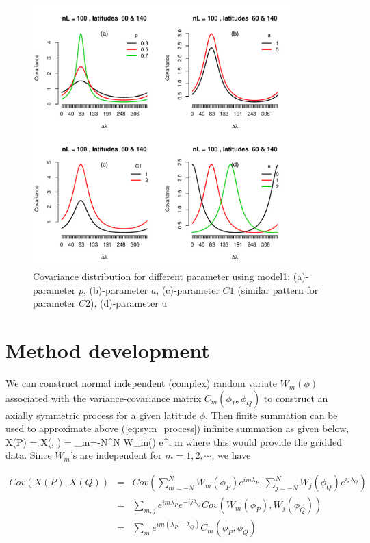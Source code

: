 	\begin{figure}[H]
		\centering
		\includegraphics[width=0.9\textwidth]{graphs/parameters_model1_2}
		\caption[Covariance distribution for different parameters using model1:] {Covariance distribution for different parameter using model1:  (a)-parameter $p$, (b)-parameter $a$, (c)-parameter $C1$ (similar pattern for parameter $C2$), (d)-parameter u}
	\end{figure}
	
	
	
	\section{Method development}
		
		
	We can construct normal independent (complex) random variate $W_m(\phi)$ associated with the variance-covariance matrix $C_m(\phi_P, \phi_Q)$ to construct an axially symmetric process for a given latitude $\phi$. Then finite summation can be used to approximate above (\ref{eq:sym_process}) infinite summation as given below,
	\beq
	X(P) = X(\phi, \lambda) = \sum_{m=-N}^{N} W_m(\phi) e^{i m \lambda}
	\eeq
	where this would provide  the gridded data.
	Since $W_m$'s are independent for $m = 1, 2, \cdots$, we have
		
	\begin{eqnarray*}
		Cov(X(P), {X(Q)}) &=& Cov\left(\sum_{m = -N}^{N} W_m(\phi_P) e^{i m \lambda_P}, \sum_{j=-N}^{N} {W_j(\phi_Q)} e^{i j \lambda_Q}\right) \\
		&=& \sum_{m, j} e^{i m \lambda_P} e^{-i j \lambda_Q} Cov(W_m(\phi_P), {W_j(\phi_Q)}) \\
		&=& \sum_{m} e^{im (\lambda_P - \lambda_Q)} C_m(\phi_P, \phi_Q)
	\end{eqnarray*}
		
